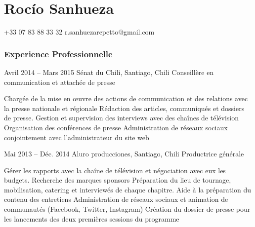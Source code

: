 \documentclass{tccv}
\begin{document}
\part{Roc\'io Sanhueza}


    {+33 07 83 88 33 32}
    {r.sanhuezarepetto@gmail.com}



\section{Experience Professionnelle}


     

\begin{eventlist}

\item{Avril 2014 -- Mars 2015}
     {Sénat du Chili, Santiago, Chili}
     {Conseillère en communication et attachée de presse}

    \begin{itemize}
      \cvitem[\checkmark] Chargée de la mise en œuvre des actions de communication et des relations avec la presse nationale et régionale
      \cvitem[\checkmark] Rédaction des articles, communiqués et dossiers de presse. Gestion et supervision des interviews avec des chaînes de télévision
      \cvitem[\checkmark] Organisation des conférences de presse
      \cvitem[\checkmark] Administration de réseaux sociaux conjointement avec l’administrateur du site web
    \end{itemize}     
     


\item{Mai 2013 -- Déc. 2014}
     {Aluro producciones, Santiago, Chili}
     {Productrice générale}
    
    \begin{itemize}
      \cvitem[\checkmark] Gérer les rapports avec la chaîne de télévision et négociation avec eux les budgets. Recherche des marques sponsors
      \cvitem[\checkmark] Préparation du lieu de tournage, mobilisation, catering et interviewés de chaque chapitre. Aide à la préparation du contenu des entretiens
      \cvitem[\checkmark] Administration de réseaux sociaux et animation de communautés (Facebook, Twitter, Instagram)
      \cvitem[\checkmark] Création du dossier de presse pour les lancements des deux premières sessions du programme

    \end{itemize}     


\end{eventlist}
\end{document}
